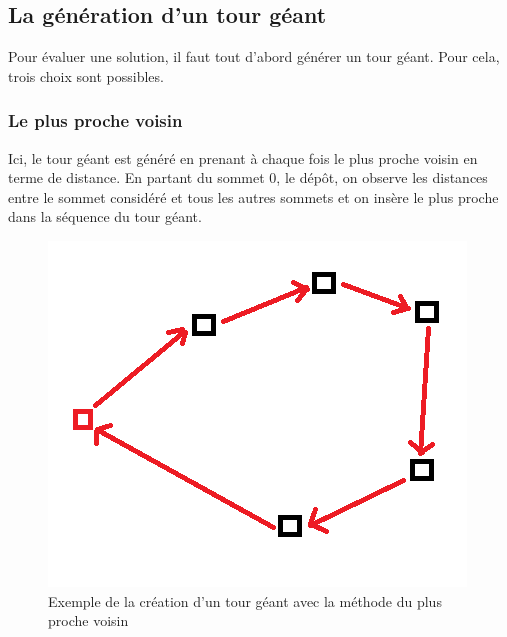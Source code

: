 \documentclass[12pt]{article}
\begin{document}
    \subsection{La génération d'un tour géant}
    Pour évaluer une solution, il faut tout d'abord générer un tour géant. Pour cela, trois choix sont possibles.
    \subsubsection{Le plus proche voisin}
        Ici, le tour géant est généré en prenant à chaque fois le plus proche voisin en terme de distance. En partant du sommet 0, le dépôt, on observe les distances entre le sommet considéré et tous les autres sommets et on insère le plus proche dans la séquence du tour géant.
         \begin{figure}[!h]
	    \centering
	    \includegraphics[scale = 1]{plu_proche.png}
	    \caption{Exemple de la création d'un tour géant avec la méthode du plus proche voisin}
	    \label{fig2}
	\end{figure}\par
\end{document}
